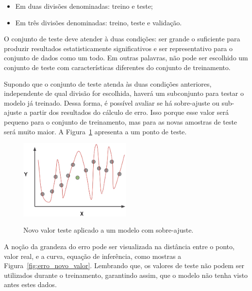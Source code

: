            \begin{itemize}
                \item Em duas divisões denominadas: treino e teste;
                \item Em três divisões denominadas: treino, teste e validação.
            \end{itemize} 
            
            O conjunto de teste deve atender à duas condições: ser grande o suficiente para produzir resultados estatisticamente significativos e ser representativo para o conjunto de dados como um todo. Em outras palavras, não pode ser escolhido um conjunto de teste com características diferentes do conjunto de treinamento. 
            
            Supondo que o conjunto de teste atenda às duas condições anteriores, independente de qual divisão for escolhida, haverá um subconjunto para testar o modelo já treinado. Dessa forma, é possível avaliar se há sobre-ajuste ou sub-ajuste a partir dos resultados do cálculo de erro. Isso porque esse valor será pequeno para o conjunto de treinamento, mas para as novas amostras de teste será muito maior. A Figura~\ref{fig:teste_overfitting_novo_valor} apresenta a um ponto de teste.
    
            \begin{figure}[H]
                \centering
                \caption{Novo valor teste aplicado a um modelo com sobre-ajuste.}
                \includegraphics[width=0.5\textwidth]{fig/2-fundamentacao/overfitting/testando_overfitting.png}
                \label{fig:teste_overfitting_novo_valor}
            \end{figure}
            
            A noção da grandeza do erro pode ser visualizada na distância entre o ponto, valor real, e a curva, equação de inferência, como mostras a Figura~\ref{fig:erro_novo_valor}. Lembrando que, os valores de teste não podem ser utilizados durante o treinamento, garantindo assim, que o modelo não tenha visto antes estes dados.
    
